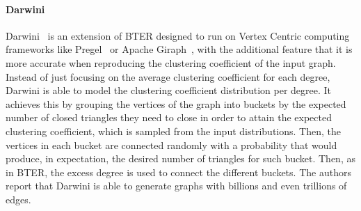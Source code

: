\paragraph{Darwini} Darwini~\cite{edunov2016darwini} is an extension of BTER
designed to run on Vertex Centric computing frameworks like
Pregel~\cite{malewicz2010pregel} or Apache Giraph~\cite{ching2015one}, with the
additional feature that it is more accurate when reproducing the clustering
coefficient of the input graph. Instead of just focusing on the average
clustering coefficient for each degree, Darwini is able to model the clustering
coefficient distribution per degree. It achieves this by grouping the vertices
of the graph into buckets by the expected number of closed triangles they need
to close in order to attain the expected clustering coefficient, which is
sampled from the input distributions. Then, the vertices in each bucket are
connected randomly with a probability that would produce, in expectation, the
desired number of triangles for such bucket. Then, as in BTER, the excess degree
is used to connect the different buckets. The authors report that Darwini is
able to generate graphs with billions and even trillions of edges.




